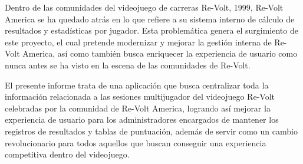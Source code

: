 Dentro de las comunidades del videojuego de carreras Re-Volt, 1999, Re-Volt America se ha quedado atrás en lo que refiere a su sistema interno de cálculo de resultados y estadísticas por jugador. Esta problemática genera el surgimiento de este proyecto, el cual pretende modernizar y mejorar la gestión interna de Re-Volt America, así como también busca enriquecer la experiencia de usuario como nunca antes se ha visto en la escena de las comunidades de Re-Volt.

El presente informe trata de una aplicación que busca centralizar toda la información relacionada a las sesiones multijugador del videojuego Re-Volt celebradas por la comunidad de Re-Volt America, logrando así mejorar la experiencia de usuario para los administradores encargados de mantener los registros de resultados y tablas de puntuación, además de servir como un cambio revolucionario para todos aquellos que buscan conseguir una experiencia competitiva dentro del videojuego. 
